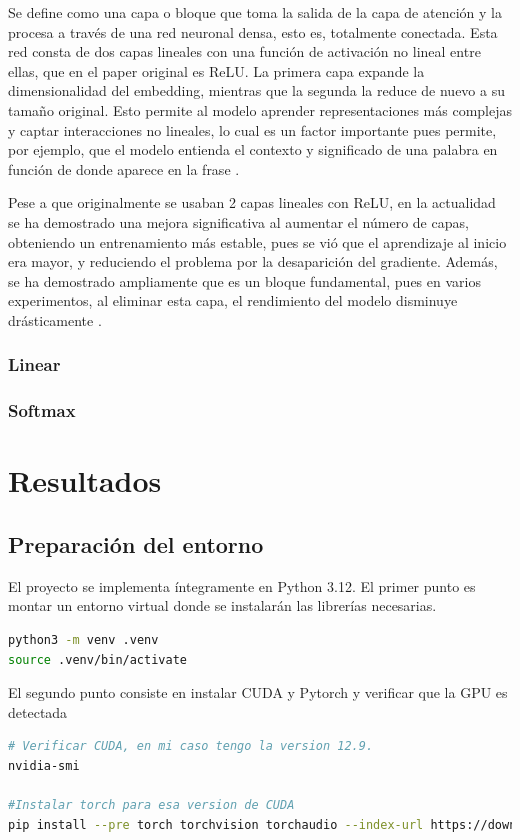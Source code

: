 \documentclass[11pt]{book}
\newcommand{\clearemptydoublepage}{\newpage{\pagestyle{empty}\cleardoublepage}}
\theoremstyle{plain}
\theoremstyle{definition}
\begin{document}
Se define como una capa o bloque que toma la salida de la capa de atención y la procesa a través de una red neuronal densa, esto es, totalmente conectada. Esta red consta de dos capas lineales con una función de activación no lineal entre ellas, que en el paper original es ReLU. La primera capa expande la dimensionalidad del embedding, mientras que la segunda la reduce de nuevo a su tamaño original. Esto permite al modelo aprender representaciones más complejas y captar interacciones no lineales, lo cual es un factor importante pues permite, por ejemplo, que el modelo entienda el contexto y significado de una palabra en función de donde aparece en la frase \parencite{kyeg_feedforward_demystified}.

Pese a que originalmente se usaban 2 capas lineales con ReLU, en la actualidad se ha demostrado una mejora significativa al aumentar el número de capas, obteniendo un entrenamiento más estable, pues se vió que el aprendizaje al inicio era mayor, y reduciendo el problema por la desaparición del gradiente. Además, se ha demostrado ampliamente que es un bloque fundamental, pues en varios experimentos, al eliminar esta capa, el rendimiento del modelo disminuye drásticamente \parencite{gerber2025ffn}.


\subsection{Linear}
\subsection{Softmax}


\clearemptydoublepage

\chapter{Resultados}
\section{Preparación del entorno}
El proyecto se implementa íntegramente en Python 3.12. 
El primer punto es montar un entorno virtual donde se instalarán las librerías necesarias.

\begin{lstlisting}[language=bash]
python3 -m venv .venv
source .venv/bin/activate
\end{lstlisting}
El segundo punto consiste en instalar CUDA y Pytorch y verificar que la GPU es detectada
\begin{lstlisting}[language=bash]
# Verificar CUDA, en mi caso tengo la version 12.9.
nvidia-smi

#Instalar torch para esa version de CUDA
pip install --pre torch torchvision torchaudio --index-url https://download.pytorch.org/whl/nightly/cu129
\end{lstlisting}
\end{document}
